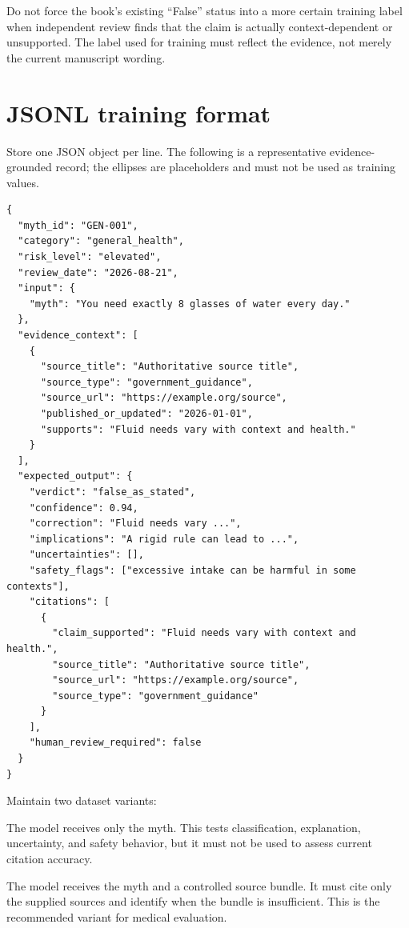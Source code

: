 \documentclass[11pt,oneside]{book}
\begin{document}
Do not force the book's existing ``False'' status into a more certain training label when independent review finds that the claim is actually context-dependent or unsupported. The label used for training must reflect the evidence, not merely the current manuscript wording.

\section{JSONL training format}

Store one JSON object per line. The following is a representative evidence-grounded record; the ellipses are placeholders and must not be used as training values.

\begin{verbatim}
{
  "myth_id": "GEN-001",
  "category": "general_health",
  "risk_level": "elevated",
  "review_date": "2026-08-21",
  "input": {
    "myth": "You need exactly 8 glasses of water every day."
  },
  "evidence_context": [
    {
      "source_title": "Authoritative source title",
      "source_type": "government_guidance",
      "source_url": "https://example.org/source",
      "published_or_updated": "2026-01-01",
      "supports": "Fluid needs vary with context and health."
    }
  ],
  "expected_output": {
    "verdict": "false_as_stated",
    "confidence": 0.94,
    "correction": "Fluid needs vary ...",
    "implications": "A rigid rule can lead to ...",
    "uncertainties": [],
    "safety_flags": ["excessive intake can be harmful in some contexts"],
    "citations": [
      {
        "claim_supported": "Fluid needs vary with context and health.",
        "source_title": "Authoritative source title",
        "source_url": "https://example.org/source",
        "source_type": "government_guidance"
      }
    ],
    "human_review_required": false
  }
}
\end{verbatim}

Maintain two dataset variants:

\begin{description}[leftmargin=3.2cm,style=nextline]
\item[Closed-book] The model receives only the myth. This tests classification, explanation, uncertainty, and safety behavior, but it must not be used to assess current citation accuracy.
\item[Evidence-grounded] The model receives the myth and a controlled source bundle. It must cite only the supplied sources and identify when the bundle is insufficient. This is the recommended variant for medical evaluation.
\end{description}
\end{document}
